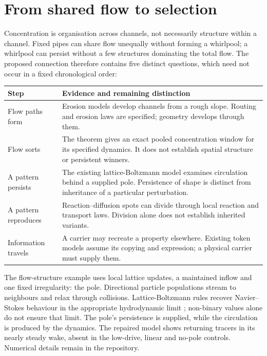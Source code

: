 \section{From shared flow to selection}
\label{sec:thought}

Concentration is organisation across channels, not necessarily structure within
a channel. Fixed pipes can share flow unequally without forming a whirlpool;
a whirlpool can persist without a few structures dominating the total flow.
The proposed connection therefore contains five distinct questions, which need
not occur in a fixed chronological order:

\begin{center}
\begin{tabular}{@{}p{.25\linewidth}p{.70\linewidth}@{}}
\toprule
Step & Evidence and remaining distinction \\
\midrule
Flow paths form & Erosion models develop channels from a rough slope. Routing
and erosion laws are specified; geometry develops through them. \\[3pt]
Flow sorts & The theorem gives an exact pooled concentration window for its
specified dynamics. It does not establish spatial structure or persistent winners. \\[3pt]
A pattern persists & The existing lattice-Boltzmann model examines circulation
behind a supplied pole. Persistence of shape is distinct from inheritance of a
particular perturbation. \\[3pt]
A pattern reproduces & Reaction--diffusion spots can divide through local
reaction and transport laws. Division alone does not establish inherited variants. \\[3pt]
Information travels & A carrier may recreate a property elsewhere. Existing token
models assume its copying and expression; a physical carrier must supply them. \\
\bottomrule
\end{tabular}
\end{center}

The flow-structure example uses local lattice updates, a maintained inflow and
one fixed irregularity: the pole. Directional particle populations stream to
neighbours and relax through collisions. Lattice-Boltzmann rules recover
Navier--Stokes behaviour in the appropriate hydrodynamic limit \cite{lbm};
non-binary values alone do not ensure that limit. The pole's persistence is
supplied, while the circulation is produced by the dynamics. The repaired model
shows returning tracers in its nearly steady wake, absent in the low-drive,
linear and no-pole controls. Numerical details remain in the repository.

